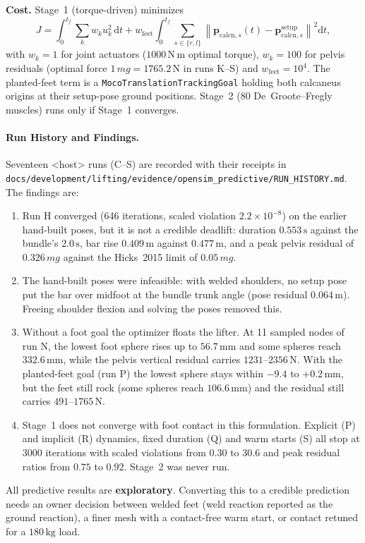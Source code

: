 \documentclass[11pt,a4paper]{article}
\begin{document}
\textbf{Cost.} Stage~1 (torque-driven) minimizes
\begin{equation}
J = \int_{0}^{t_f} \sum_{k} w_k u_k^2 \,\mathrm{d}t
  + w_\text{feet} \int_{0}^{t_f} \sum_{s\in\{r,l\}} \left\lVert \mathbf{p}_{\text{calcn},s}(t) - \mathbf{p}_{\text{calcn},s}^\text{setup} \right\rVert^2 \mathrm{d}t,
\end{equation}
with $w_k = 1$ for joint actuators ($1000\,\mathrm{N\,m}$ optimal torque), $w_k = 100$ for pelvis residuals (optimal force $1\,mg = 1765.2\,\mathrm{N}$ in runs K--S) and $w_\text{feet} = 10^4$. The planted-feet term is a \texttt{MocoTranslationTrackingGoal} holding both calcaneus origins at their setup-pose ground positions. Stage~2 (80 De~Groote--Fregly muscles) runs only if Stage~1 converges.

\paragraph{Run History and Findings.}
Seventeen <host> runs (C--S) are recorded with their receipts in \texttt{docs/development/lifting/evidence/opensim\_predictive/RUN\_HISTORY.md}. The findings are:
\begin{enumerate}
\item Run H converged (646 iterations, scaled violation $2.2\times10^{-8}$) on the earlier hand-built poses, but it is not a credible deadlift: duration $0.553\,\mathrm{s}$ against the bundle's $2.0\,\mathrm{s}$, bar rise $0.409\,\mathrm{m}$ against $0.477\,\mathrm{m}$, and a peak pelvis residual of $0.326\,mg$ against the Hicks~2015 limit of $0.05\,mg$.
\item The hand-built poses were infeasible: with welded shoulders, no setup pose put the bar over midfoot at the bundle trunk angle (pose residual $0.064\,\mathrm{m}$). Freeing shoulder flexion and solving the poses removed this.
\item Without a foot goal the optimizer floats the lifter. At 11 sampled nodes of run N, the lowest foot sphere rises up to $56.7\,\mathrm{mm}$ and some spheres reach $332.6\,\mathrm{mm}$, while the pelvis vertical residual carries $1231$--$2356\,\mathrm{N}$. With the planted-feet goal (run P) the lowest sphere stays within $-9.4$ to $+0.2\,\mathrm{mm}$, but the feet still rock (some spheres reach $106.6\,\mathrm{mm}$) and the residual still carries $491$--$1765\,\mathrm{N}$.
\item Stage~1 does not converge with foot contact in this formulation. Explicit (P) and implicit (R) dynamics, fixed duration (Q) and warm starts (S) all stop at 3000 iterations with scaled violations from $0.30$ to $30.6$ and peak residual ratios from $0.75$ to $0.92$. Stage~2 was never run.
\end{enumerate}
All predictive results are \textbf{exploratory}. Converting this to a credible prediction needs an owner decision between welded feet (weld reaction reported as the ground reaction), a finer mesh with a contact-free warm start, or contact retuned for a $180\,\mathrm{kg}$ load.
\end{document}
